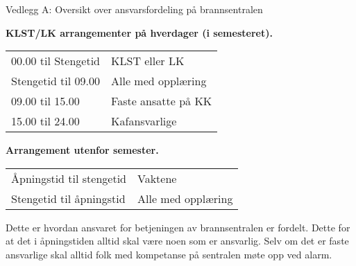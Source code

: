 \begin{instruks}{Vedlegg A: Oversikt over ansvarsfordeling på brannsentralen}{}{}
    
    \textbf{KLST/LK arrangementer på hverdager (i semesteret).}
    
    
    \begin{tabular}{ll}
        00.00 til Stengetid &   KLST eller LK \\
        Stengetid til 09.00 &   Alle med opplæring \\
        09.00 til 15.00 &     Faste ansatte på KK \\
        15.00 til 24.00 &      Kafansvarlige 
    \end{tabular}

    
    \textbf{Arrangement utenfor semester.}
    
    
    \begin{tabular}{ll}
        Åpningstid til stengetid &     Vaktene \\
        Stengetid til åpningstid &     Alle med opplæring
    \end{tabular}

    
    Dette er hvordan ansvaret for betjeningen av brannsentralen er fordelt. Dette for at det i
    åpningstiden alltid skal være
    noen som er ansvarlig. Selv om det er faste ansvarlige skal alltid folk med kompetanse på
    sentralen møte opp ved
    alarm.
\end{instruks}



